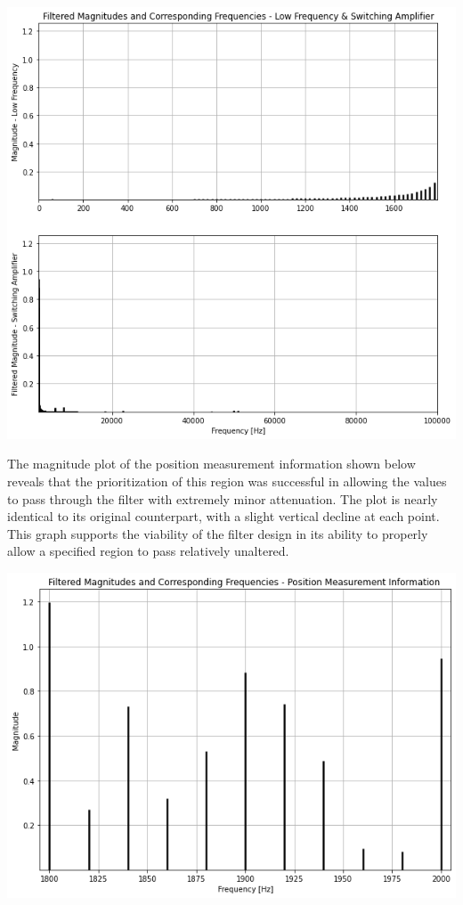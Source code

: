\documentclass[12pt]{report}
\begin{document}
\begin{center}
	\includegraphics[scale = 0.5]{Lab 12 - Plots/Filtered FFT2.png}\\[1.0 cm]
\end{center}

The magnitude plot of the position measurement information shown below reveals that the prioritization of this region was successful in allowing the values to pass through the filter with extremely minor attenuation. The plot is nearly identical to its original counterpart, with a slight vertical decline at each point. This graph supports the viability of the filter design in its ability to properly allow a specified region to pass relatively unaltered. \\

\begin{center}
	\includegraphics[scale = 0.5]{Lab 12 - Plots/Filtered FFT3.png}\\[1.0 cm]
\end{center}
\end{document}

